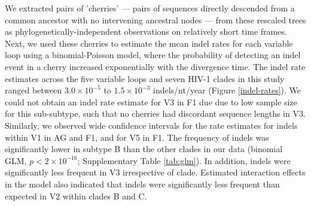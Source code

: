 \documentclass[12pt]{article}
\begin{document}
We extracted pairs of 'cherries' --- pairs of sequences directly descended from a common ancestor with no intervening ancestral nodes --- from these rescaled trees as phylo\-genetically-independent observations on relatively short time frames.
Next, we used these cherries to estimate the mean indel rates for each variable loop using a binomial-Poisson model, where the probability of detecting an indel event in a cherry increased exponentially with the divergence time.
The indel rate estimates across the five variable loops and seven HIV-1 clades in this study ranged between $3.0 \times10^{-5}$ to $1.5\times10^{-3}$ indels/nt/year (Figure \ref{indel-rates}). 
We could not obtain an indel rate estimate for V3 in F1 due due to low sample size for this sub-subtype, such that no cherries had discordant sequence lengths in V3.
Similarly, we observed wide confidence intervals for the rate estimates for indels within V1 in AG and F1, and for V5 in F1.  
The frequency of indels was significantly lower in subtype B than the other clades in our data (binomial GLM, $p<2\times 10^{-16}$; Supplementary Table \ref{tab:glm}).
In addition, indels were significantly less frequent in V3 irrespective of clade.
Estimated interaction effects in the model also indicated that indels were significantly less frequent than expected in V2 within clades B and C.
\end{document}
